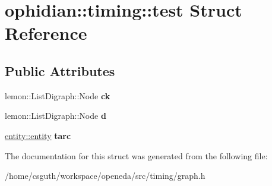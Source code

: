 \hypertarget{structophidian_1_1timing_1_1test}{\section{ophidian\-:\-:timing\-:\-:test Struct Reference}
\label{structophidian_1_1timing_1_1test}
}
\subsection*{Public Attributes}
\begin{DoxyCompactItemize}
\item 
\hypertarget{structophidian_1_1timing_1_1test_afe4e1fb0081480b9ded56d6aef39cf05}{lemon\-::\-List\-Digraph\-::\-Node {\bfseries ck}}\label{structophidian_1_1timing_1_1test_afe4e1fb0081480b9ded56d6aef39cf05}

\item 
\hypertarget{structophidian_1_1timing_1_1test_ac3f29d79152cb953145d5d208581a30e}{lemon\-::\-List\-Digraph\-::\-Node {\bfseries d}}\label{structophidian_1_1timing_1_1test_ac3f29d79152cb953145d5d208581a30e}

\item 
\hypertarget{structophidian_1_1timing_1_1test_ad4b35f9ecfc89f40920ff831932a7c29}{\hyperlink{classophidian_1_1entity_1_1entity}{entity\-::entity} {\bfseries tarc}}\label{structophidian_1_1timing_1_1test_ad4b35f9ecfc89f40920ff831932a7c29}

\end{DoxyCompactItemize}


The documentation for this struct was generated from the following file\-:\begin{DoxyCompactItemize}
\item 
/home/csguth/workspace/openeda/src/timing/graph.\-h\end{DoxyCompactItemize}
